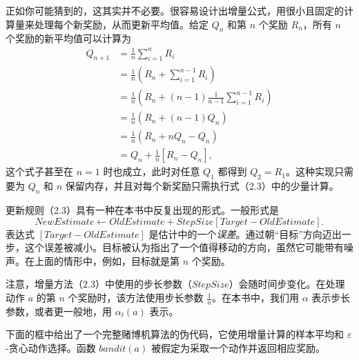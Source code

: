 \documentclass[UTF8,12pt,a4paper,fontset=fandol]{ctexart}
\begin{document}
正如你可能猜到的，这其实并不必要。很容易设计出增量公式，用很小且固定的计算量来处理每个新奖励，从而更新平均值。给定 $Q_n$ 和第 $n$ 个奖励 $R_n$，所有 $n$ 个奖励的新平均值可以计算为
\begin{equation}
\begin{aligned}
Q_{n+1}
&= \frac{1}{n}\sum_{i=1}^{n}R_i\\
&= \frac{1}{n}\left(R_n+\sum_{i=1}^{n-1}R_i\right)\\
&= \frac{1}{n}\left(R_n+(n-1)\frac{1}{n-1}\sum_{i=1}^{n-1}R_i\right)\\
&= \frac{1}{n}\left(R_n+(n-1)Q_n\right)\\
&= \frac{1}{n}\left(R_n+nQ_n-Q_n\right)\\
&= Q_n+\frac{1}{n}\left[R_n-Q_n\right],
\end{aligned}
\tag{2.3}
\end{equation}
这个式子甚至在 $n=1$ 时也成立，此时对任意 $Q_1$ 都得到 $Q_2=R_1$。这种实现只需要为 $Q_n$ 和 $n$ 保留内存，并且对每个新奖励只需执行式（2.3）中的少量计算。

更新规则（2.3）具有一种在本书中反复出现的形式。一般形式是
\begin{equation}
\mathit{NewEstimate}\leftarrow \mathit{OldEstimate}
+\mathit{StepSize}\left[\mathit{Target}-\mathit{OldEstimate}\right].
\tag{2.4}
\end{equation}
表达式 $\left[\mathit{Target}-\mathit{OldEstimate}\right]$ 是估计中的一个\textit{误差}。通过朝“目标”方向迈出一步，这个误差被减小。目标被认为指出了一个值得移动的方向，虽然它可能带有噪声。在上面的情形中，例如，目标就是第 $n$ 个奖励。

注意，增量方法（2.3）中使用的步长参数（$\mathit{StepSize}$）会随时间步变化。在处理动作 $a$ 的第 $n$ 个奖励时，该方法使用步长参数 $\frac{1}{n}$。在本书中，我们用 $\alpha$ 表示步长参数，或者更一般地，用 $\alpha_t(a)$ 表示。

下面的框中给出了一个完整赌博机算法的伪代码，它使用增量计算的样本平均和 $\varepsilon$-贪心动作选择。函数 $\mathit{bandit}(a)$ 被假定为采取一个动作并返回相应奖励。

\begin{center}
\end{center}
\end{document}
